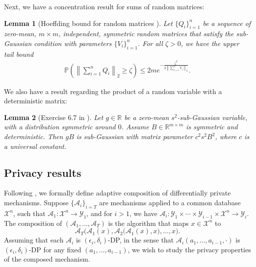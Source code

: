 \documentclass{article}
\newtheorem{lemma}{Lemma}
\begin{document}
Next, we have a concentration result for sums of random matrices:
\begin{lemma}[Hoeffding bound for random matrices \cite{wainwright2019high}]
\label{lemma:Matrix_Hoeff} 
Let $\{Q_i\}_{i = 1}^n$ be a sequence of zero-mean, $m \times m$, independent, symmetric random matrices that satisfy the sub-Gaussian condition with parameters $\{V_i\}_{i = 1}^n$. For all $\zeta > 0$, we have the upper tail bound
\begin{align*}
\mathbb{P}\left(\left\|\sum_{i = 1}^nQ_i\right\|_2 \geq \zeta\right) \leq 2me^{-\frac{\zeta^2}{2\left\|\sum_{i = 1}^nV_i\right\|_2}}.
\end{align*}
\end{lemma}

We also have a result regarding the product of a random variable with a deterministic matrix:
\begin{lemma}[Exercise 6.7 in \cite{wainwright2019high}]
\label{lemma:gB_Ex6.7} 
Let $g \in \mathbb{R}$ be a zero-mean $s^2$-sub-Gaussian variable, with a distribution symmetric around $0$. Assume $B \in \mathbb{R}^{m \times m}$ is symmetric and deterministic. Then $gB$ is sub-Gaussian with matrix parameter $c^2s^2B^2$, where $c$ is a universal constant.
\end{lemma}


\subsection{Privacy results}
\label{AppPrivacy}

Following \cite{dwork2010boosting}, we formally define adaptive composition of differentially private mechanisms. Suppose $\{\mathcal{A}_i\}_{i=T}$ are mechanisms applied to a common database $\mathcal{X}^n$, such that $\mathcal{A}_1: \mathcal{X}^n \rightarrow \mathcal{Y}_1$, and for $i > 1$, we have $\mathcal{A}_i: \mathcal{Y}_1 \times \cdots \times \mathcal{Y}_{i-1} \times \mathcal{X}^n \rightarrow \mathcal{Y}_i$. The composition of $(\mathcal{A}_1, \dots, \mathcal{A}_T)$ is the algorithm that maps $x \in \mathcal{X}^n$ to
\begin{equation*}
\mathcal{A}_T\Big(\mathcal{A}_1(x), \mathcal{A}_2\big(\mathcal{A}_1(x), x\big), \dots, x\Big).
\end{equation*}
Assuming that each $\mathcal{A}_i$ is $(\epsilon_i, \delta_i)$-DP, in the sense that $\mathcal{A}_i(a_1, \dots, a_{i-1}, \cdot)$ is $(\epsilon_i, \delta_i)$-DP for any fixed $(a_1, \dots, a_{i-1})$, we wish to study the privacy properties of the composed mechanism.
\end{document}
